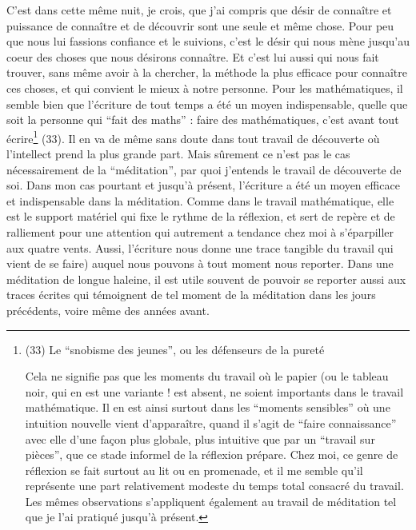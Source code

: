 C'est dans cette même nuit, je crois, que j'ai compris que désir de connaître et puissance de connaître et de découvrir sont une seule et même chose. Pour peu que nous lui fassions confiance et le suivions, c'est le désir qui nous mène jusqu'au coeur des choses que nous désirons connaître. Et c'est lui aussi qui nous fait trouver, sans même avoir à la chercher, la méthode la plus efficace pour connaître ces choses, et qui convient le mieux à notre personne. Pour les mathématiques, il semble bien que l'écriture de tout temps a été un moyen indispensable, quelle que soit la personne qui ``fait des maths'' : faire des mathématiques, c'est avant tout écrire\footnote{(33) Le ``snobisme des jeunes'', ou les défenseurs de la pureté

Cela ne signifie pas que les moments du travail où le papier (ou le tableau noir, qui en est une variante ! est absent, ne soient importants dans le travail mathématique. Il en est ainsi surtout dans les ``moments sensibles'' où une intuition nouvelle vient d'apparaître, quand il s'agit de ``faire connaissance'' avec elle d'une façon plus globale, plus intuitive que par un ``travail sur pièces'', que ce stade informel de la réflexion prépare. Chez moi, ce genre de réflexion se fait surtout au lit ou en promenade, et il me semble qu'il représente une part relativement modeste du temps total consacré du travail. Les mêmes observations s'appliquent également au travail de méditation tel que je l'ai pratiqué jusqu'à présent.} (33). Il en va de même sans doute dans tout travail de découverte où l'intellect prend la plus grande part. Mais sûrement ce n'est pas le cas nécessairement de la ``méditation'', par quoi j'entends le travail de découverte de soi. Dans mon cas pourtant et jusqu'à présent, l'écriture a été un moyen efficace et indispensable dans la méditation. Comme dans le travail mathématique, elle est le support matériel qui fixe le rythme de la réflexion, et sert de repère et de ralliement pour une attention qui autrement a tendance chez moi à s'éparpiller aux quatre vents. Aussi, l'écriture nous donne une trace tangible du travail qui vient de se faire) auquel nous pouvons à tout moment nous reporter. Dans une méditation de longue haleine, il est utile souvent de pouvoir se reporter aussi aux traces écrites qui témoignent de tel moment de la méditation dans les jours précédents, voire même des années avant.

